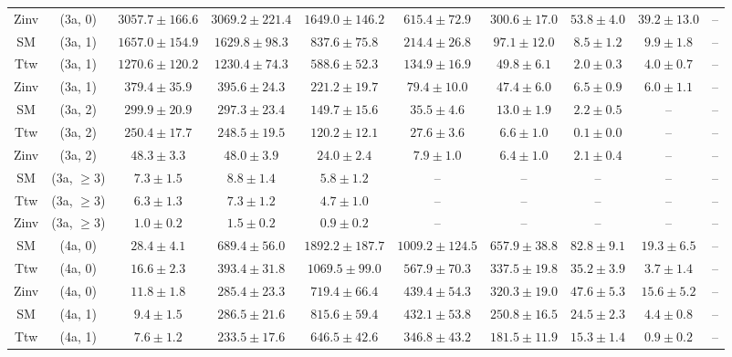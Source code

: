 \begin{table}[h!]
{\begin{tabular}{cccccccccc}
	Zinv & (3a, 0) & $3057.7\pm 166.6$ & $3069.2\pm 221.4$ & $1649.0\pm 146.2$ & $615.4\pm 72.9$ & $300.6\pm 17.0$ & $53.8\pm 4.0$ & $39.2\pm 13.0$ & -- \\[0.5ex] 
	SM & (3a, 1) & $1657.0\pm 154.9$ & $1629.8\pm 98.3$ & $837.6\pm 75.8$ & $214.4\pm 26.8$ & $97.1\pm 12.0$ & $8.5\pm 1.2$ & $9.9\pm 1.8$ & -- \\[0.5ex] 
	Ttw & (3a, 1) & $1270.6\pm 120.2$ & $1230.4\pm 74.3$ & $588.6\pm 52.3$ & $134.9\pm 16.9$ & $49.8\pm 6.1$ & $2.0\pm 0.3$ & $4.0\pm 0.7$ & -- \\[0.5ex] 
	Zinv & (3a, 1) & $379.4\pm 35.9$ & $395.6\pm 24.3$ & $221.2\pm 19.7$ & $79.4\pm 10.0$ & $47.4\pm 6.0$ & $6.5\pm 0.9$ & $6.0\pm 1.1$ & -- \\[0.5ex] 
	SM & (3a, 2) & $299.9\pm 20.9$ & $297.3\pm 23.4$ & $149.7\pm 15.6$ & $35.5\pm 4.6$ & $13.0\pm 1.9$ & $2.2\pm 0.5$ & -- & -- \\[0.5ex] 
	Ttw & (3a, 2) & $250.4\pm 17.7$ & $248.5\pm 19.5$ & $120.2\pm 12.1$ & $27.6\pm 3.6$ & $6.6\pm 1.0$ & $0.1\pm 0.0$ & -- & -- \\[0.5ex] 
	Zinv & (3a, 2) & $48.3\pm 3.3$ & $48.0\pm 3.9$ & $24.0\pm 2.4$ & $7.9\pm 1.0$ & $6.4\pm 1.0$ & $2.1\pm 0.4$ & -- & -- \\[0.5ex] 
	SM & (3a, $\ge3$) & $7.3\pm 1.5$ & $8.8\pm 1.4$ & $5.8\pm 1.2$ & -- & -- & -- & -- & -- \\[0.5ex] 
	Ttw & (3a, $\ge3$) & $6.3\pm 1.3$ & $7.3\pm 1.2$ & $4.7\pm 1.0$ & -- & -- & -- & -- & -- \\[0.5ex] 
	Zinv & (3a, $\ge3$) & $1.0\pm 0.2$ & $1.5\pm 0.2$ & $0.9\pm 0.2$ & -- & -- & -- & -- & -- \\[0.5ex] 
	SM & (4a, 0) & $28.4\pm 4.1$ & $689.4\pm 56.0$ & $1892.2\pm 187.7$ & $1009.2\pm 124.5$ & $657.9\pm 38.8$ & $82.8\pm 9.1$ & $19.3\pm 6.5$ & -- \\[0.5ex] 
	Ttw & (4a, 0) & $16.6\pm 2.3$ & $393.4\pm 31.8$ & $1069.5\pm 99.0$ & $567.9\pm 70.3$ & $337.5\pm 19.8$ & $35.2\pm 3.9$ & $3.7\pm 1.4$ & -- \\[0.5ex] 
	Zinv & (4a, 0) & $11.8\pm 1.8$ & $285.4\pm 23.3$ & $719.4\pm 66.4$ & $439.4\pm 54.3$ & $320.3\pm 19.0$ & $47.6\pm 5.3$ & $15.6\pm 5.2$ & -- \\[0.5ex] 
	SM & (4a, 1) & $9.4\pm 1.5$ & $286.5\pm 21.6$ & $815.6\pm 59.4$ & $432.1\pm 53.8$ & $250.8\pm 16.5$ & $24.5\pm 2.3$ & $4.4\pm 0.8$ & -- \\[0.5ex] 
	Ttw & (4a, 1) & $7.6\pm 1.2$ & $233.5\pm 17.6$ & $646.5\pm 42.6$ & $346.8\pm 43.2$ & $181.5\pm 11.9$ & $15.3\pm 1.4$ & $0.9\pm 0.2$ & -- \\[0.5ex] 

\end{tabular}}
\end{table}

